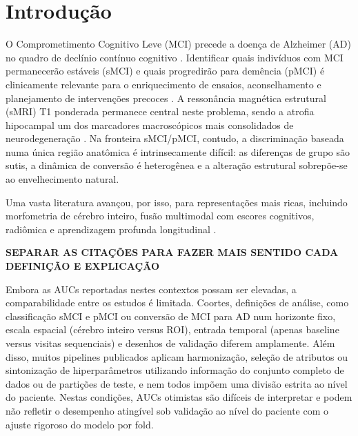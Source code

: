 \documentclass[review]{elsarticle}
\newcommand{\sugestao}[2]{%
	\textcolor{red}{\sout{\textbf{#1}}}%
	\textcolor{blue!100!black}{\textbf{#2}}%
}
\begin{document}
	
	\section{Introdução}\label{sec:Introduction}
	
	O Comprometimento Cognitivo Leve (MCI) precede a doença de Alzheimer (AD) no quadro de declínio contínuo cognitivo \cite{petersen-1999}. Identificar quais indivíduos com MCI permanecerão estáveis (sMCI) e quais progredirão para demência (pMCI) é clinicamente relevante para o enriquecimento de ensaios, aconselhamento e planejamento de intervenções precoces \cite{petersen-2009}. A ressonância magnética  estrutural (sMRI) T1 ponderada permanece central neste problema, sendo a atrofia hipocampal um dos marcadores macroscópicos mais consolidados de neurodegeneração \cite{scheltens-1992}. Na fronteira sMCI/pMCI, contudo, a discriminação baseada numa única região anatômica é intrinsecamente difícil: as diferenças de grupo são sutis, a dinâmica de conversão é heterogênea e a alteração estrutural sobrepõe-se ao envelhecimento natural.
	
	Uma vasta literatura avançou, por isso, para representações mais ricas, incluindo morfometria de cérebro inteiro, fusão multimodal com escores cognitivos, radiômica e aprendizagem profunda longitudinal \cite{moradi-2015,ye-2012,zhang-2019,lin-2020,aghajanian-2025}. 
	
	\sugestao{}{SEPARAR AS CITAÇÕES PARA FAZER MAIS SENTIDO CADA DEFINIÇÃO E EXPLICAÇÃO}
	
	Embora as AUCs reportadas nestes contextos possam ser elevadas, a comparabilidade entre os estudos é limitada. Coortes, definições de análise, como classificação sMCI e pMCI ou conversão de MCI para AD num horizonte fixo, escala espacial (cérebro inteiro versus ROI), entrada temporal (apenas baseline versus visitas sequenciais) e desenhos de validação diferem amplamente. Além disso, muitos pipelines publicados aplicam harmonização, seleção de atributos ou sintonização de hiperparâmetros utilizando informação do conjunto completo de dados ou de partições de teste, e nem todos impõem uma divisão estrita ao nível do paciente. Nestas condições, AUCs otimistas são difíceis de interpretar e podem não refletir o desempenho atingível sob validação ao nível do paciente com o ajuste rigoroso do modelo por fold.
	
\end{document}
